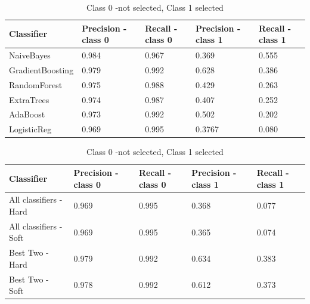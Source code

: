 \begin{table}
 \begin{tabular}{|l |l |l |l |l |}
\hline
Classifier &Precision - class 0 & Recall - class 0  &Precision - class 1 & Recall - class 1  \\ \hline
 NaiveBayes & 0.984 &  0.967&  0.369 & 0.555 \\ 
GradientBoosting & 0.979 & 0.992 &  0.628 & 0.386\\
RandomForest & 0.975 &  0.988 & 0.429&  0.263 \\
ExtraTrees & 0.974 & 0.987 &  0.407& 0.252 \\
AdaBoost & 0.973&  0.992 & 0.502& 0.202 \\
LogisticReg &0.969 &  0.995& 0.3767 &  0.080\\\hline
\end{tabular}
\caption{Class 0 -not selected, Class 1 selected}
\label{table:classifiers}
\end{table}

\begin{table}
 \begin{tabular}{|l |l |l |l |l |}
\hline
Classifier &Precision - class 0 & Recall - class 0  &Precision - class 1 & Recall - class 1  \\ \hline
All classifiers - Hard & 0.969&  0.995&  0.368&  0.077\\
All classifiers  - Soft & 0.969 &  0.995&  0.365&   0.074\\ 
Best Two - Hard & 0.979&  0.992&  0.634&  0.383\\
Best Two  - Soft &0.978&  0.992 & 0.612 &  0.373\\ \hline
\end{tabular}
\caption{Class 0 -not selected, Class 1 selected}
\label{table:votingClassifiers}
\end{table}